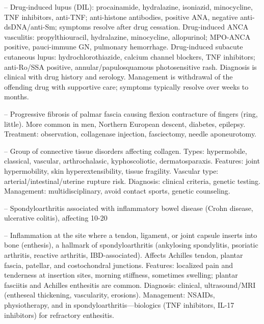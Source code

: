 -- Drug-induced lupus (DIL): procainamide, hydralazine, isoniazid, minocycline, TNF inhibitors, anti-TNF; anti-histone antibodies, positive ANA, negative anti-dsDNA/anti-Sm; symptoms resolve after drug cessation. Drug-induced ANCA vasculitis: propylthiouracil, hydralazine, minocycline, allopurinol; MPO-ANCA positive, pauci-immune GN, pulmonary hemorrhage. Drug-induced subacute cutaneous lupus: hydrochlorothiazide, calcium channel blockers, TNF inhibitors; anti-Ro/SSA positive, annular/papulosquamous photosensitive rash. Diagnosis is clinical with drug history and serology. Management is withdrawal of the offending drug with supportive care; symptoms typically resolve over weeks to months.

-- Progressive fibrosis of palmar fascia causing flexion contracture of fingers (ring, little). More common in men, Northern European descent, diabetes, epilepsy. Treatment: observation, collagenase injection, fasciectomy, needle aponeurotomy.

-- Group of connective tissue disorders affecting collagen. Types: hypermobile, classical, vascular, arthrochalasic, kyphoscoliotic, dermatosparaxis. Features: joint hypermobility, skin hyperextensibility, tissue fragility. Vascular type: arterial/intestinal/uterine rupture risk. Diagnosis: clinical criteria, genetic testing. Management: multidisciplinary, avoid contact sports, genetic counseling.

-- Spondyloarthritis associated with inflammatory bowel disease (Crohn disease, ulcerative colitis), affecting 10-20%

-- Inflammation at the site where a tendon, ligament, or joint capsule inserts into bone (enthesis), a hallmark of spondyloarthritis (ankylosing spondylitis, psoriatic arthritis, reactive arthritis, IBD-associated). Affects Achilles tendon, plantar fascia, patellar, and costochondral junctions. Features: localized pain and tenderness at insertion sites, morning stiffness, sometimes swelling; plantar fasciitis and Achilles enthesitis are common. Diagnosis: clinical, ultrasound/MRI (entheseal thickening, vascularity, erosions). Management: NSAIDs, physiotherapy, and in spondyloarthritis—biologics (TNF inhibitors, IL-17 inhibitors) for refractory enthesitis.

